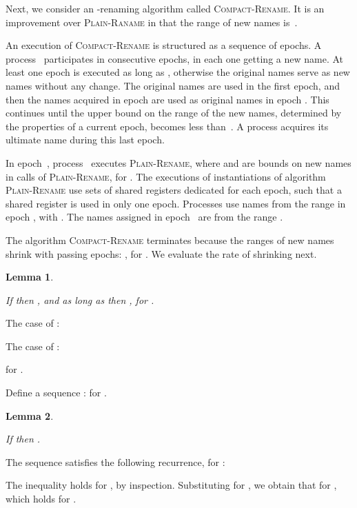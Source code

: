 \documentclass[11pt]{article}
\newcommand{\qed}{\hfill  \smallbreak}
\newenvironment{proof}{\noindent{\bf Proof:}}{\qed}
\newtheorem{lemma}{Lemma}
\begin{document}
Next, we consider an -renaming algorithm called \textsc{Compact-Rename}. 
It is an improvement over \textsc{Plain-Raname} in that the range of new names is~.

An execution of \textsc{Compact-Rename} is structured as a sequence of epochs.
A process~ participates in consecutive epochs, in each one getting a new name.
At least one epoch is executed as long as , otherwise the original names serve as new names without any change.
The original names are used in the first epoch, and then the names acquired in epoch  are used as original names in epoch .  
This continues until the upper bound on the range of the new names, determined by the properties of a current epoch, becomes less than~.
A process acquires its ultimate name during this last epoch.

In epoch~, process~ executes \textsc{Plain-Rename}, where  and  are bounds on new names in calls of \textsc{Plain-Rename}, for .
The executions of instantiations of algorithm \textsc{Plain-Rename} use sets of shared registers dedicated for each epoch, such that a shared register is used in only one epoch.
Processes use names from the range  in epoch ,  with .
The names assigned in epoch~ are from the range .

The algorithm \textsc{Compact-Rename} terminates because the ranges of new names shrink with passing epochs: , for .
We evaluate the rate of shrinking next.



\begin{lemma}
\label{lem:shrinking-rate}

If  then , and as long as  then ,  for .
\end{lemma}

\begin{proof}
The case of :

The case of :

for .
\end{proof}

Define a sequence :  for .




\begin{lemma}
\label{lem:sequence-a}

If  then .
\end{lemma}

\begin{proof}
The sequence  satisfies the following recurrence, for :

The inequality  holds for , by inspection.
Substituting  for , we obtain that  for , which holds for .
\end{proof}
\end{document}
